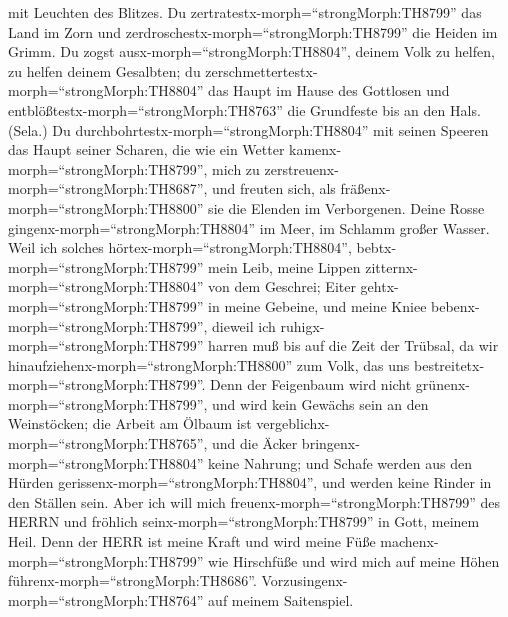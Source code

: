 mit Leuchten des Blitzes.  Du
zertratestx-morph=``strongMorph:TH8799'' das Land im Zorn und
zerdroschestx-morph=``strongMorph:TH8799'' die Heiden im Grimm.
 Du zogst ausx-morph=``strongMorph:TH8804'', deinem Volk zu
helfen, zu helfen deinem Gesalbten; du
zerschmettertestx-morph=``strongMorph:TH8804'' das Haupt im Hause des
Gottlosen und entblößtestx-morph=``strongMorph:TH8763'' die Grundfeste
bis an den Hals. (Sela.)  Du
durchbohrtestx-morph=``strongMorph:TH8804'' mit seinen Speeren das Haupt
seiner Scharen, die wie ein Wetter kamenx-morph=``strongMorph:TH8799'',
mich zu zerstreuenx-morph=``strongMorph:TH8687'', und freuten sich, als
fräßenx-morph=``strongMorph:TH8800'' sie die Elenden im Verborgenen.
 Deine Rosse gingenx-morph=``strongMorph:TH8804'' im Meer,
im Schlamm großer Wasser.  Weil ich solches
hörtex-morph=``strongMorph:TH8804'', bebtx-morph=``strongMorph:TH8799''
mein Leib, meine Lippen zitternx-morph=``strongMorph:TH8804'' von dem
Geschrei; Eiter gehtx-morph=``strongMorph:TH8799'' in meine Gebeine, und
meine Kniee bebenx-morph=``strongMorph:TH8799'', dieweil ich
ruhigx-morph=``strongMorph:TH8799'' harren muß bis auf die Zeit der
Trübsal, da wir hinaufziehenx-morph=``strongMorph:TH8800'' zum Volk, das
uns bestreitetx-morph=``strongMorph:TH8799''.  Denn der
Feigenbaum wird nicht grünenx-morph=``strongMorph:TH8799'', und wird
kein Gewächs sein an den Weinstöcken; die Arbeit am Ölbaum ist
vergeblichx-morph=``strongMorph:TH8765'', und die Äcker
bringenx-morph=``strongMorph:TH8804'' keine Nahrung; und Schafe werden
aus den Hürden gerissenx-morph=``strongMorph:TH8804'', und werden keine
Rinder in den Ställen sein.  Aber ich will mich
freuenx-morph=``strongMorph:TH8799'' des HERRN und fröhlich
seinx-morph=``strongMorph:TH8799'' in Gott, meinem Heil. 
Denn der HERR ist meine Kraft und wird meine Füße
machenx-morph=``strongMorph:TH8799'' wie Hirschfüße und wird mich auf
meine Höhen führenx-morph=``strongMorph:TH8686''.
Vorzusingenx-morph=``strongMorph:TH8764'' auf meinem Saitenspiel.
